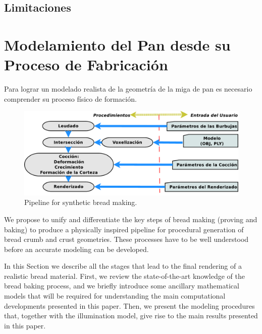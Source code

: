 \documentclass[spanish,a4paper,11pt,oneside,links]{report}
\begin{document}
\subsection{Limitaciones}


\section{Modelamiento del Pan desde su Proceso de Fabricación}
Para lograr un modelado realista de la geometría de la miga de pan es necesario comprender su proceso físico de formación.

\begin{figure}
\includegraphics[width=19cm]{figures/pipeline}
\caption{Pipeline for synthetic bread making.}
\label{FigPipeline}
\end{figure}

We propose to unify and differentiate the key steps of bread making (proving and baking) to produce a physically inspired pipeline for procedural generation of bread crumb and crust geometries.
These processes have to be well understood before an accurate modeling can be developed.

In this Section we describe all the stages that lead to the final rendering of a realistic bread material.
First, we review the state-of-the-art knowledge of the bread baking process, and we briefly introduce some ancillary mathematical models that will be required for understanding the main computational developments presented in this paper. 
Then, we present the modeling procedures that, together with the illumination model, give rise to the main results presented in this paper.
\end{document}
